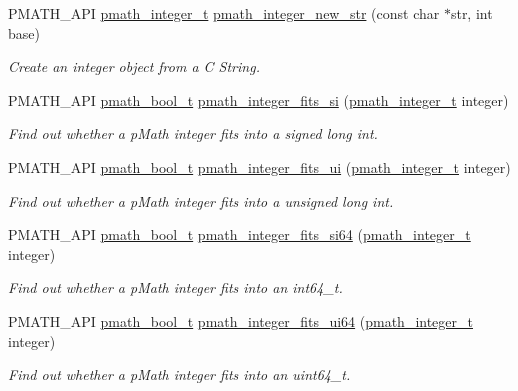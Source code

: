 \begin{CompactItemize}
PMATH\_\-API \hyperlink{classpmath__integer__t}{pmath\_\-integer\_\-t} \hyperlink{group__numbers_gaca3cb69b051e8f361784f2dc3836fcf}{pmath\_\-integer\_\-new\_\-str} (const char $\ast$str, int base)
\begin{CompactList}\small\item\em Create an integer object from a C String. \item\end{CompactList}\item 
PMATH\_\-API \hyperlink{group__general__types_gc92090cb0b56345d6c379ed2341d4ef4}{pmath\_\-bool\_\-t} \hyperlink{group__numbers_gc220e06754067b9ba4a7c823017ad32e}{pmath\_\-integer\_\-fits\_\-si} (\hyperlink{classpmath__integer__t}{pmath\_\-integer\_\-t} integer)
\begin{CompactList}\small\item\em Find out whether a pMath integer fits into a signed long int. \item\end{CompactList}\item 
PMATH\_\-API \hyperlink{group__general__types_gc92090cb0b56345d6c379ed2341d4ef4}{pmath\_\-bool\_\-t} \hyperlink{group__numbers_gb12e5e34b7918cb6beee23c57cdd0d36}{pmath\_\-integer\_\-fits\_\-ui} (\hyperlink{classpmath__integer__t}{pmath\_\-integer\_\-t} integer)
\begin{CompactList}\small\item\em Find out whether a pMath integer fits into a unsigned long int. \item\end{CompactList}\item 
PMATH\_\-API \hyperlink{group__general__types_gc92090cb0b56345d6c379ed2341d4ef4}{pmath\_\-bool\_\-t} \hyperlink{group__numbers_g3533b0ffc74d5cc7a0b618c5127ab5de}{pmath\_\-integer\_\-fits\_\-si64} (\hyperlink{classpmath__integer__t}{pmath\_\-integer\_\-t} integer)
\begin{CompactList}\small\item\em Find out whether a pMath integer fits into an int64\_\-t. \item\end{CompactList}\item 
PMATH\_\-API \hyperlink{group__general__types_gc92090cb0b56345d6c379ed2341d4ef4}{pmath\_\-bool\_\-t} \hyperlink{group__numbers_gc783aa678e68ed2f877ccdb0ea8cca7d}{pmath\_\-integer\_\-fits\_\-ui64} (\hyperlink{classpmath__integer__t}{pmath\_\-integer\_\-t} integer)
\begin{CompactList}\small\item\em Find out whether a pMath integer fits into an uint64\_\-t. \item\end{CompactList}\item 

\end{CompactItemize}
